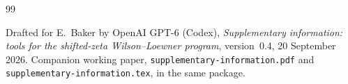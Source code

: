 \begin{thebibliography}{99}
\raggedright
{}
Drafted for E.~Baker by OpenAI GPT-6 (Codex),
\emph{Supplementary information: tools for the shifted-zeta
Wilson--Loewner program}, version~0.4, 20 September 2026.
Companion working paper, \nolinkurl{supplementary-information.pdf}
and \nolinkurl{supplementary-information.tex}, in the same package.

\end{thebibliography}
